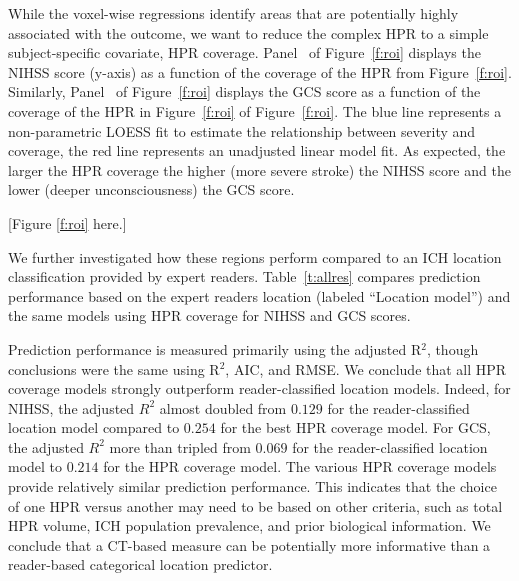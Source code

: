 \documentclass[10pt]{article}\usepackage[]{graphicx}\usepackage[]{color}
\begin{document}
While the voxel-wise regressions identify areas that are potentially highly associated with the outcome, we want to reduce the complex HPR to a simple subject-specific covariate, HPR coverage. Panel~\protect{} of Figure~\ref{f:roi} displays the NIHSS score (y-axis) as a function of the coverage of the HPR from Figure~\ref{f:roi}\protect{}. Similarly, Panel~\protect{} of Figure~\ref{f:roi} displays the GCS score as a function of the coverage of the HPR in Figure~\ref{f:roi}\protect{} of Figure~\ref{f:roi}.  The blue line represents a non-parametric LOESS fit to estimate the relationship between severity and coverage, the red line represents an unadjusted linear model fit.  As expected, the larger the HPR coverage the higher (more severe stroke) the NIHSS score and the lower (deeper unconsciousness) the GCS score.

[Figure \ref{f:roi} here.]











We further investigated how these regions perform compared to an ICH location classification provided by expert readers. Table~\ref{t:allres} compares prediction performance based on the expert readers location (labeled ``Location model'') and the same models using HPR coverage for NIHSS and GCS scores. 

Prediction performance is measured primarily using the adjusted R$^2$, though conclusions were the same using R$^2$, AIC, and RMSE. We conclude that all HPR coverage models strongly outperform reader-classified location models.  Indeed, for NIHSS, the adjusted $R^2$ almost doubled from $0.129$  for  the reader-classified location model compared to $0.254$ for the best HPR coverage model.  For GCS,
the adjusted $R^2$ more than tripled from $0.069$ for the reader-classified location model to $0.214$ for the HPR coverage model. The various HPR coverage models provide relatively similar prediction performance. This indicates that the choice of one HPR versus another may need to be based on other criteria, such as total HPR volume, ICH population prevalence, and prior biological information.
We conclude that a CT-based measure can be potentially more informative than a reader-based categorical location predictor.
\end{document}
